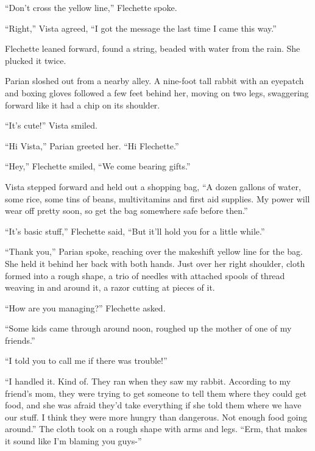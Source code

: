 





``Don't cross the yellow line,'' Flechette spoke.



``Right,'' Vista agreed, ``I got the message the last time I came this way.''



Flechette leaned forward, found a string, beaded with water from the rain.  She plucked it twice.



Parian sloshed out from a nearby alley.  A nine-foot tall rabbit with an eyepatch and boxing gloves followed a few feet behind her, moving on two legs, swaggering forward like it had a chip on its shoulder.



``It's cute!'' Vista smiled.



``Hi Vista,'' Parian greeted her.  ``Hi Flechette.''



``Hey,'' Flechette smiled, ``We come bearing gifts.''



Vista stepped forward and held out a shopping bag, ``A dozen gallons of water, some rice, some tins of beans, multivitamins and first aid supplies.  My power will wear off pretty soon, so get the bag somewhere safe before then.''



``It's basic stuff,'' Flechette said, ``But it'll hold you for a little while.''



``Thank you,'' Parian spoke, reaching over the makeshift yellow line for the bag.  She held it behind her back with both hands.  Just over her right shoulder, cloth formed into a rough shape, a trio of needles with attached spools of thread weaving in and around it, a razor cutting at pieces of it.



``How are you managing?''  Flechette asked.



``Some kids came through around noon, roughed up the mother of one of my friends.''



``I told you to call me if there was trouble!''



``I handled it.  Kind of.  They ran when they saw my rabbit.  According to my friend's mom, they were trying to get someone to tell them where they could get food, and she was afraid they'd take everything if she told them where we have our stuff.  I think they were more hungry than dangerous.  Not enough food going around.''  The cloth took on a rough shape with arms and legs.  ``Erm, that makes it sound like I'm blaming you guys-''



